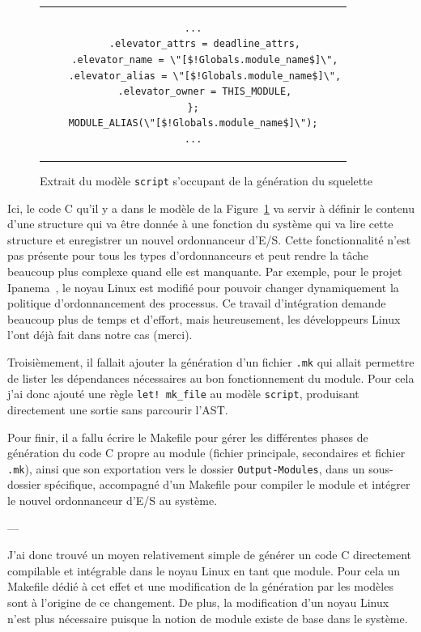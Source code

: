 \begin{figure}[h!t] \centering
    \begin{tabular}{c}
        \begin{lstlisting}[language=Phaistos-Template, linewidth=11.5cm]
    ...
    .elevator_attrs = deadline_attrs,
    .elevator_name = \"[$!Globals.module_name$]\",
    .elevator_alias = \"[$!Globals.module_name$]\",
    .elevator_owner = THIS_MODULE,
};
MODULE_ALIAS(\"[$!Globals.module_name$]\");
...
        \end{lstlisting}
    \end{tabular}
    \caption{Extrait du modèle \texttt{script} s'occupant de la génération du 
    squelette}
    \label{fig:module_name_c}
\end{figure}

Ici, le code C qu'il y a dans le modèle de la Figure~\ref{fig:module_name_c} va 
servir à définir le contenu d'une structure qui va être donnée à une fonction 
du système qui va lire cette structure et enregistrer un nouvel ordonnanceur 
d'E/S. Cette fonctionnalité n'est pas présente pour tous les types 
d'ordonnanceurs et peut rendre la tâche beaucoup plus complexe quand elle est 
manquante. Par exemple, pour le projet Ipanema~\cite{lepers2020provable}, le 
noyau Linux est modifié pour pouvoir changer dynamiquement la politique 
d'ordonnancement des processus. Ce travail d'intégration demande beaucoup plus 
de temps et d'effort, mais heureusement, les développeurs Linux l'ont déjà fait 
dans notre cas (merci).

Troisièmement, il fallait ajouter la génération d'un fichier \texttt{.mk} qui 
allait permettre de lister les dépendances nécessaires au bon fonctionnement du 
module. Pour cela j'ai donc ajouté une règle \texttt{let! mk\_file} au modèle 
\texttt{script}, produisant directement une sortie sans parcourir l'AST.

Pour finir, il a fallu écrire le Makefile pour gérer les différentes phases de 
génération du code C propre au module (fichier principale, secondaires et 
fichier \texttt{.mk}), ainsi que son exportation vers le dossier \texttt
{Output-Modules}, dans un sous-dossier spécifique, accompagné d'un Makefile 
pour compiler le module et intégrer le nouvel ordonnanceur d'E/S au système.

\begin{center}
---
\end{center}
    
J'ai donc trouvé un moyen relativement simple de générer un code C directement 
compilable et intégrable dans le noyau Linux en tant que module. Pour cela un 
Makefile dédié à cet effet et une modification de la génération par les modèles 
sont à l'origine de ce changement. De plus, la modification d'un noyau Linux 
n'est plus nécessaire puisque la notion de module existe de base dans le 
système.

